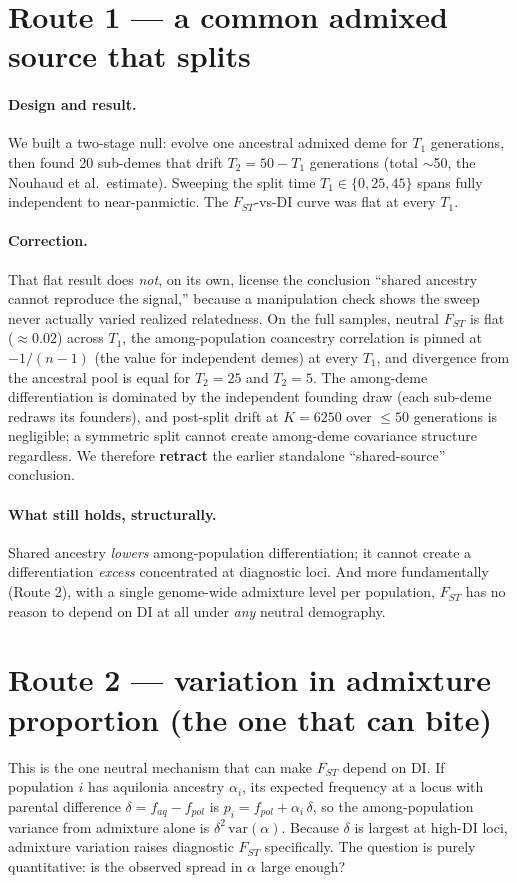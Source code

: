 \documentclass[11pt,a4paper]{article}
\begin{document}
\section{Route 1 --- a common admixed source that splits}
\paragraph{Design and result.} We built a two-stage null: evolve one ancestral admixed
deme for $T_1$ generations, then found 20 sub-demes that drift $T_2 = 50 - T_1$
generations (total $\sim$50, the Nouhaud et al.\ estimate). Sweeping the split time
$T_1 \in \{0,25,45\}$ spans fully independent to near-panmictic. The $F_{ST}$-vs-DI
curve was flat at every $T_1$.

\paragraph{Correction.} That flat result does \emph{not}, on its own, license the
conclusion ``shared ancestry cannot reproduce the signal,'' because a manipulation
check shows the sweep never actually varied realized relatedness. On the full samples,
neutral $F_{ST}$ is flat ($\approx 0.02$) across $T_1$, the among-population coancestry
correlation is pinned at $-1/(n-1)$ (the value for independent demes) at every $T_1$,
and divergence from the ancestral pool is equal for $T_2=25$ and $T_2=5$. The
among-deme differentiation is dominated by the independent founding draw (each sub-deme
redraws its founders), and post-split drift at $K=6250$ over $\le 50$ generations is
negligible; a symmetric split cannot create among-deme covariance structure regardless.
We therefore \textbf{retract} the earlier standalone ``shared-source'' conclusion.

\paragraph{What still holds, structurally.} Shared ancestry \emph{lowers} among-population
differentiation; it cannot create a differentiation \emph{excess} concentrated at
diagnostic loci. And more fundamentally (Route 2), with a single genome-wide admixture
level per population, $F_{ST}$ has no reason to depend on DI at all under \emph{any}
neutral demography.

\section{Route 2 --- variation in admixture proportion (the one that can bite)}
This is the one neutral mechanism that can make $F_{ST}$ depend on DI. If population $i$
has aquilonia ancestry $\alpha_i$, its expected frequency at a locus with parental
difference $\delta = f_{aq}-f_{pol}$ is $p_i = f_{pol} + \alpha_i\,\delta$, so the
among-population variance from admixture alone is $\delta^2\,\mathrm{var}(\alpha)$.
Because $\delta$ is largest at high-DI loci, admixture variation raises diagnostic
$F_{ST}$ specifically. The question is purely quantitative: is the observed spread in
$\alpha$ large enough?
\end{document}
